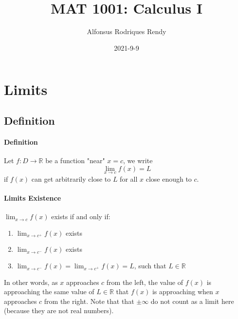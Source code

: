 \documentclass[12pt]{article}
\title{MAT 1001: Calculus I}
\author{Alfonsus Rodriques Rendy}
\date{2021-9-9}
\begin{document}
\begin{center}
    \hspace*{-0.5cm}
\end{center}

\section{Limits}
\subsection{Definition}
\paragraph{Definition} Let $f : D \rightarrow \mathbb{R}$ be a function "near" $x=c$, we write
\[
    \lim_{x \to c} f(x) = L
\]
if $f(x)$ can get arbitrarily close to $L$ for all $x$ close enough to $c$.
\paragraph{Limits Existence} $\lim_{x \to c} f(x)$ exists if and only if:
\begin{enumerate} 
    \item $\lim_{x \to c^+} f(x)$ exists
    \item $\lim_{x \to c^-} f(x)$ exists
    \item $\lim_{x \to c^-} f(x) = \lim_{x \to c^+} f(x) = L$, such that $L \in \mathbb{R}$ 
\end{enumerate}
In other words, as $x$ approaches $c$ from the left, the value of $f(x)$ is approaching the same value of $L \in \mathbb{R}$
that $f(x)$ is approaching when $x$ approaches $c$ from the right. Note that that $\pm \infty$ do not count as a limit here (because they are not
real numbers).
\end{document}

